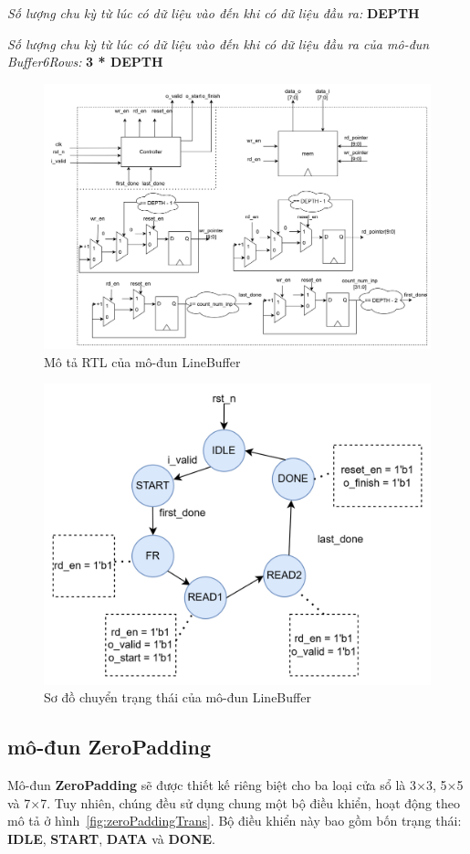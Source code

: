 \textit{Số lượng chu kỳ từ lúc có dữ liệu vào đến khi có dữ liệu đầu ra: } \textbf{DEPTH}


\textit{Số lượng chu kỳ từ lúc có dữ liệu vào đến khi có dữ liệu đầu ra của mô-đun Buffer6Rows: } \textbf{3 * DEPTH}


\begin{figure}[!ht]
    \centering
    \includegraphics[width=\linewidth]{figures/lineBuffArchitecture.png}
    \caption{Mô tả RTL của mô-đun LineBuffer}
    \label{fig:lineBuffArchitecture}
\end{figure}


\begin{figure}[!ht]
    \centering
    \includegraphics[width=0.8\linewidth]{figures/lineBufferTrans.png}
    \caption{Sơ đồ chuyển trạng thái của mô-đun LineBuffer}
    \label{fig:lineBufferTrans}
\end{figure}


\subsection{mô-đun ZeroPadding}
Mô-đun \textbf{ZeroPadding} sẽ được thiết kế riêng biệt cho ba loại cửa sổ là 3$\times$3, 5$\times$5 và 7$\times$7. Tuy nhiên, chúng đều sử dụng chung một bộ điều khiển, hoạt động theo mô tả ở hình~\ref{fig:zeroPaddingTrans}. Bộ điều khiển này bao gồm bốn trạng thái: \textbf{IDLE}, \textbf{START}, \textbf{DATA} và \textbf{DONE}.

